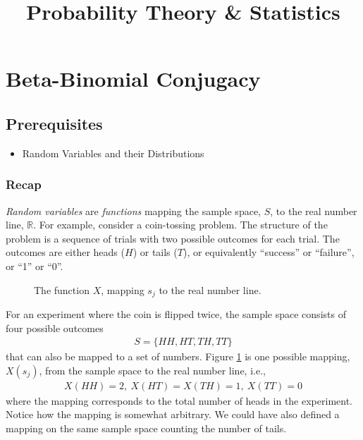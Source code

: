 \documentclass[11pt,a4paper]{article}
\title{Probability Theory \& Statistics}
\begin{document}
\maketitle
\newpage

\section{Beta-Binomial Conjugacy}

\subsection{Prerequisites}

\begin{itemize}
\item
Random Variables and their Distributions
\end{itemize}

\subsubsection{Recap}

\emph{Random variables} are \emph{functions} 
mapping the sample space, \(S\), 
to the real number line, \(\mathbb{R}\). 
For example, 
consider a coin-tossing problem. 
The structure of the problem is a sequence of trials 
with two possible outcomes for each trial. 
The outcomes are either heads (\(H\)) or tails (\(T\)), 
or equivalently ``success'' or ``failure'', 
or ``1'' or ``0''.

\begin{figure}[h!]
\centering

\caption{The function \(X\), mapping \(s_{j}\) to the real number line.}
\label{fig:mapping}
\end{figure}

For an experiment where the coin is flipped twice, 
the sample space consists of four possible outcomes
\begin{align}
S = \{HH, HT,TH, TT\}
\end{align}
that can also be mapped to a set of numbers. 
Figure \ref{fig:mapping} is one possible mapping, \(X(s_{j})\), 
from the sample space to the real number line, i.e.,
\begin{align}
X(HH) = 2,\ X(HT) = X(TH) = 1,\ X(TT) = 0
\end{align}
where the mapping corresponds 
to the total number of heads in the experiment. 
Notice how the mapping is somewhat arbitrary. 
We could have also defined a mapping on 
the same sample space counting the number of tails.
\end{document}
